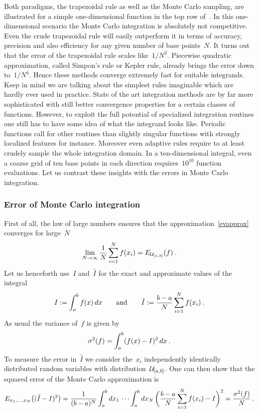 Both paradigms, the trapezoidal rule as well as the Monte Carlo sampling, are
illustrated for a simple one-dimensional function in the top row
of~. In this one-dimensional scenario the Monte Carlo
integration is absolutely not competitive. Even the crude trapezoidal rule will
easily outperform it in terms of accuracy, precision and also efficiency for any
given number of base points~$N$. It turns out that the error of the trapezoidal
rule scales like~$1/N^2$. Piecewise quadratic approximation, called Simpon's
rule or Kepler rule, already brings the error down to~$1/N^4$. Hence these
methods converge extremely fast for suitable integrands. Keep in mind we are
talking about the simplest rules imaginable which are hardly ever used in
practice. State of the art integration methods are by far more sophisticated
with still better convergence properties for a certain classes of functions.
However, to exploit the full potential of specialized integration routines one
still has to have some idea of what the integrand looks like. Periodic functions
call for other routines than slightly singular functions with strongly localized
features for instance.  Moreover even adaptive rules require to at least crudely
sample the whole integration domain. In a ten-dimensional integral, even a
coarse grid of ten base points in each direction requires~$10^{10}$ function
evaluations. Let us contrast these insights with the errors in Monte Carlo
integration.

\subsubsection{Error of Monte Carlo integration}

First of all, the law of large numbers ensures that the
approximation~\eqref{evapprox} converges for large~$N$
%
\begin{equation}
  \lim_{N \to \infty} \frac{1}{N} \sum_{i = 1}^N f(x_i) = E_{\mathcal{U}_{[a,b]}}(f)\:.
\end{equation}
%
Let us henceforth use~$I$ and~$\hat{I}$ for the exact and approximate values of
the integral
%
\begin{equation}
  I := \int_a^b f(x) \,dx \qquad\text{and}\qquad
  \hat{I} := \frac{b-a}{N} \sum_{i=1}^N f(x_i)\:.
\end{equation}
%
As usual the variance of~$f$ is given by
%
\begin{equation}
  \sigma^2(f) = \int_a^b (f(x) - I)^2 \,dx\:.
\end{equation}
%
To measure the error in~$\hat{I}$ we consider the~$x_i$ independently
identically distributed random variables with distribution~$\mathcal{U}_{[a,b]}$. One
can then show that the squared error of the Monte Carlo approximation is
%
\begin{equation}\label{mcerror}
  E_{x_1, \dots , x_N}\bigl((\hat{I} - I)^2\bigr) =
  \frac{1}{(b-a)^N}\int_a^b dx_1\, \cdots \int_a^b dx_N\,
  \biggl(\frac{b-a}{N} \sum_{i=1}^N f(x_i) - I\biggr)^2 =
  \frac{\sigma^2(f)}{N}\:.
\end{equation}

